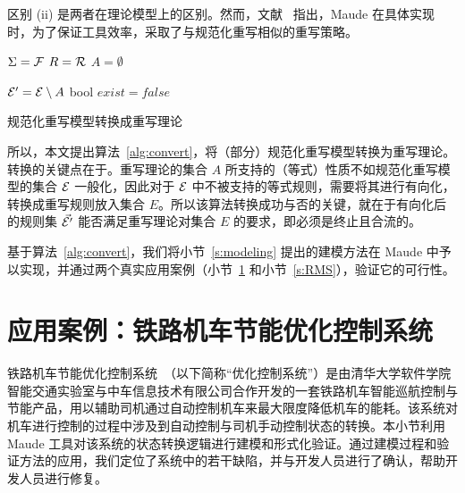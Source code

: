 区别 (ii) 是两者在理论模型上的区别。然而，文献~ 指出，Maude 在具体实现时，为了保证工具效率，采取了与规范化重写相似的重写策略。

\begin{algorithm}[ht] 

    $\Sigma = \mathcal{F}$\;
    $R = \mathcal{R}$\;
    $A = \emptyset$\;


    $\mathcal{E}' = \mathcal{E} \setminus A$\;
    bool $exist = false$\;


     
\caption{规范化重写模型转换成重写理论}
\label{alg:convert}
\end{algorithm}

所以，本文提出算法~\ref{alg:convert}，将（部分）规范化重写模型转换为重写理论。转换的关键点在于。重写理论的集合 $A$ 所支持的（等式）性质不如规范化重写模型的集合 $\mathcal{E}$ 一般化，因此对于 $\mathcal{E}$ 中不被支持的等式规则，需要将其进行有向化，转换成重写规则放入集合 $E$。所以该算法转换成功与否的关键，就在于有向化后的规则集 $\vec{\mathcal{E}'}$ 能否满足重写理论对集合 $E$ 的要求，即必须是终止且合流的。

基于算法~\ref{alg:convert}，我们将小节~\ref{s:modeling} 提出的建模方法在 Maude 中予以实现，并通过两个真实应用案例（小节~\ref{s:TO} 和小节~\ref{s:RMS}），验证它的可行性。 



\section{应用案例：铁路机车节能优化控制系统}
\label{s:TO}

铁路机车节能优化控制系统~\cite{DBLP:journals/tc/HuangDYS16}（以下简称“优化控制系统”）是由清华大学软件学院智能交通实验室与中车信息技术有限公司合作开发的一套铁路机车智能巡航控制与节能产品，用以辅助司机通过自动控制机车来最大限度降低机车的能耗。该系统对机车进行控制的过程中涉及到自动控制与司机手动控制状态的转换。本小节利用 Maude 工具对该系统的状态转换逻辑进行建模和形式化验证。通过建模过程和验证方法的应用，我们定位了系统中的若干缺陷，并与开发人员进行了确认，帮助开发人员进行修复。

